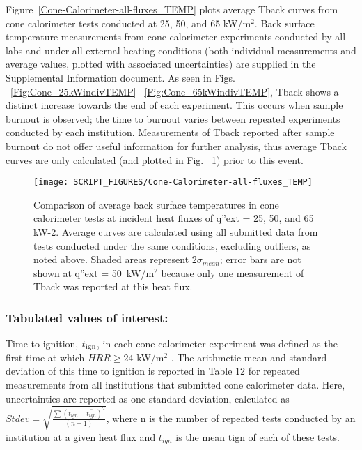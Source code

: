 \documentclass{book}
\begin{document}
Figure~\ref{Cone-Calorimeter-all-fluxes_TEMP} plots average Tback curves from cone calorimeter tests conducted at 25, 50, and 65 kW/m$^2$. Back surface temperature measurements from cone calorimeter experiments conducted by all labs and under all external heating conditions (both individual measurements and average values, plotted with associated uncertainties) are supplied in the Supplemental Information document. As seen in Figs. ~\ref{Fig:Cone_25kWindivTEMP}-~\ref{Fig:Cone_65kWindivTEMP}, Tback shows a distinct increase towards the end of each experiment. This occurs when sample burnout is observed; the time to burnout varies between repeated experiments conducted by each institution. Measurements of Tback reported after sample burnout do not offer useful information for further analysis, thus average Tback curves are only calculated (and plotted in Fig. ~\ref{Fig:Cone-Calorimeter-all-fluxes_TEMP}) prior to this event.

\begin{figure}
  \centering
  \texttt{[image: SCRIPT\_FIGURES/Cone-Calorimeter-all-fluxes\_TEMP]}
  \caption{Comparison of average back surface temperatures in cone calorimeter tests at incident heat fluxes of q”ext = 25, 50, and 65 kW-2. Average curves are calculated using all submitted data from tests conducted under the same conditions, excluding outliers, as noted above. Shaded areas represent $2\sigma_{mean}$; error bars are not shown at q”ext = 50~kW/m$^2$ because only one measurement of Tback was reported at this heat flux.}
  \label{Fig:Cone-Calorimeter-all-fluxes_TEMP}
\end{figure}


\subsubsection{Tabulated values of interest:}

Time to ignition, $t_{\rm ign}$, in each cone calorimeter experiment was defined as the first time at which $HRR \ge 24$ kW/m$^2$ \cite{lyon2007criteria}. The arithmetic mean and standard deviation of this time to ignition is reported in Table 12 for repeated measurements from all institutions that submitted cone calorimeter data. Here, uncertainties are reported as one standard deviation, calculated as $Stdev=\sqrt{\frac{\sum\left(t_{ign}-\bar{t_{ign}}\right)^2}{(n-1)}}$, where n is the number of repeated tests conducted by an institution at a given heat flux and $\bar{t_{ign}}$ is the mean tign of each of these tests.
\end{document}
